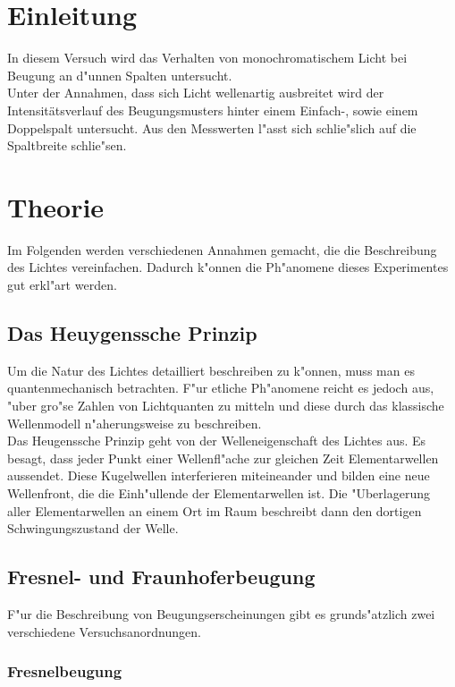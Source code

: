 \section{Einleitung}
	\label{sec:einleitung}
	In diesem Versuch wird das Verhalten von monochromatischem Licht bei Beugung an d"unnen Spalten untersucht.\\
	Unter der Annahmen, dass sich Licht wellenartig ausbreitet wird der Intensitätsverlauf des Beugungsmusters hinter einem Einfach-, sowie einem Doppelspalt untersucht.
	Aus den Messwerten l"asst sich schlie"slich auf die Spaltbreite schlie"sen.

\section{Theorie}
	\label{sec:theorie}

	Im Folgenden werden verschiedenen Annahmen gemacht, die die Beschreibung des Lichtes vereinfachen.
	Dadurch k"onnen die Ph"anomene dieses Experimentes gut erkl"art werden.

	\subsection{Das Heuygenssche Prinzip}

		Um die Natur des Lichtes detailliert beschreiben zu k"onnen, muss man es quantenmechanisch betrachten.
		F"ur etliche Ph"anomene reicht es jedoch aus, "uber gro"se Zahlen von Lichtquanten zu mitteln und diese durch das klassische Wellenmodell n"aherungsweise zu beschreiben.\\

		Das Heugenssche Prinzip geht von der Welleneigenschaft des Lichtes aus.
		Es besagt, dass jeder Punkt einer Wellenfl"ache zur gleichen Zeit Elementarwellen aussendet.
		Diese Kugelwellen interferieren miteineander und bilden eine neue Wellenfront,
		die die Einh"ullende der Elementarwellen ist.
		Die "Uberlagerung aller Elementarwellen an einem Ort im Raum beschreibt dann den dortigen Schwingungszustand der Welle.

	\subsection{Fresnel- und Fraunhoferbeugung}
		\label{subsec:beugung}

		F"ur die Beschreibung von Beugungserscheinungen gibt es grunds"atzlich zwei verschiedene Versuchsanordnungen.

		\subsubsection{Fresnelbeugung}
			\label{subsubsec:fresnel}

